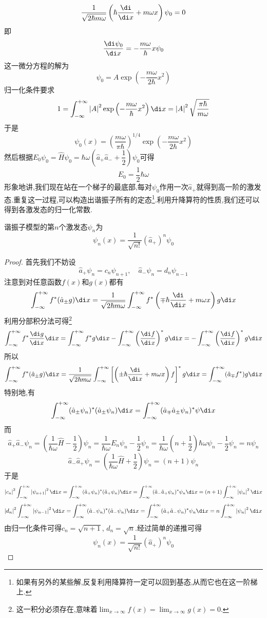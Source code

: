 \documentclass{ctexart}
\begin{document}
\[\dfrac{1}{\sqrt{2\hbar m\omega}}\left(\hbar\dfrac{\di}{\di x}+m\omega x\right)\psi_0=0\]
即
\[\dfrac{\di\psi_0}{\di x}=-\dfrac{m\omega}{\hbar}x\psi_0\]
这一微分方程的解为
\[\psi_0=A\exp\left(-\dfrac{m\omega}{2\hbar}x^2\right)\]
归一化条件要求
\[1=\int_{-\infty}^{+\infty}\left|A\right|^2\exp\left(-\dfrac{m\omega}{\hbar}x^2\right)\di x=\left|A\right|^2\sqrt{\dfrac{\pi\hbar}{m\omega}}\]
于是
\[\psi_0(x)=\left(\dfrac{m\omega}{\pi\hbar}\right)^{1/4}\exp\left(-\dfrac{m\omega}{2\hbar}x^2\right)\]
然后根据$E_0\psi_0=\hat{H}\psi_0=\hbar\omega\left(\hat{a}_+\hat{a}_-+\dfrac12\right)\psi_0$可得
\[E_0=\dfrac12\hbar\omega\]
\indent 形象地讲,我们现在站在一个梯子的最底部,每对$\psi_0$作用一次$\hat{a}_{+}$就得到高一阶的激发态.重复这一过程,可以构造出谐振子所有的定态\footnote{如果有另外的某些解,反复利用降算符一定可以回到基态,从而它也在这一阶梯上.}.利用升降算符的性质,我们还可以得到各激发态的归一化常数.
\begin{theorem}
    谐振子模型的第$n$个激发态$\psi_n$为
    \[\psi_n(x)=\dfrac{1}{\sqrt{n!}}(\hat{a}_+)^n\psi_0\]
\end{theorem}
\begin{proof}
    首先我们不妨设
    \[\hat{a}_+\psi_n=c_n\psi_{n+1},\quad\hat{a}_-\psi_n=d_n\psi_{n-1}\]
    注意到对任意函数$f(x)$和$g(x)$都有
    \[\int_{-\infty}^{+\infty}f^\ast(\hat{a}_{\pm}g)\di x=\dfrac{1}{\sqrt{2\hbar m\omega}}\int_{-\infty}^{+\infty}f^\ast\left(\mp\hbar\dfrac{\di}{\di x}+m\omega x\right)g\di x\]
    利用分部积分法可得\footnote{这一积分必须存在,意味着$\displaystyle\lim_{x\to\infty}f(x)=\lim_{x\to\infty}g(x)=0$.}
    \[\int_{-\infty}^{+\infty}f^\ast\dfrac{\di g}{\di x}\di x=\int_{-\infty}^{+\infty}f^\ast g\di x-\int_{-\infty}^{+\infty}\left(\dfrac{\di f}{\di x}\right)^\ast g\di x=-\int_{-\infty}^{+\infty}\left(\dfrac{\di f}{\di x}\right)^\ast g\di x\]
    所以
    \[\int_{-\infty}^{+\infty}f^\ast(\hat{a}_{\pm}g)\di x=\dfrac{1}{\sqrt{2\hbar m\omega}}\int_{-\infty}^{+\infty}\left[\left(\pm\hbar\dfrac{\di}{\di x}+m\omega x\right)f\right]^\ast g\di x=\int_{-\infty}^{+\infty}(\hat{a}_{\mp}f^\ast)g\di x\]
    特别地,有
    \[\int_{-\infty}^{+\infty}(\hat{a}_{\pm}\psi_n)^\ast(\hat{a}_{\pm}\psi_n)\di x=\int_{-\infty}^{+\infty}(\hat{a}_{\mp}\hat{a}_{\pm}\psi_n)^\ast\psi\di x\]
    而
    \[\hat{a}_{+}\hat{a}_{-}\psi_n=\left(\dfrac{1}{\hbar\omega}\hat{H}-\dfrac12\right)\psi_n=\dfrac{1}{\hbar\omega}E_n\psi_n-\dfrac12\psi_n=\dfrac{1}{\hbar\omega}\left(n+\dfrac12\right)\hbar\omega\psi_n-\dfrac12\psi_n=n\psi_n\]
    \[\hat{a}_{-}\hat{a}_{+}\psi_n=\left(\dfrac{1}{\hbar\omega}\hat{H}+\dfrac12\right)\psi_n=(n+1)\psi_n\]
    于是
    \[\left|c_n\right|^2\int_{-\infty}^{+\infty}\left|\psi_{n+1}\right|^2\di x=\int_{-\infty}^{+\infty}(\hat{a}_{+}\psi_n)^\ast(\hat{a}_{+}\psi_n)\di x=\int_{-\infty}^{+\infty}(\hat{a}_{-}\hat{a}_{+}\psi_n)^\ast\psi_n\di x=(n+1)\int_{-\infty}^{+\infty}\left|\psi_n\right|^2\di x\]
    \[\left|d_n\right|^2\int_{-\infty}^{+\infty}\left|\psi_{n-1}\right|^2\di x=\int_{-\infty}^{+\infty}(\hat{a}_{-}\psi_n)^\ast(\hat{a}_{-}\psi_n)\di x=\int_{-\infty}^{+\infty}(\hat{a}_{+}\hat{a}_{-}\psi_n)^\ast\psi_n\di x=n\int_{-\infty}^{+\infty}\left|\psi_n\right|^2\di x\]
    由归一化条件可得$c_n=\sqrt{n+1}$, $d_n=\sqrt{n}$.经过简单的递推可得
    \[\psi_n(x)=\dfrac{1}{\sqrt{n!}}(\hat{a}_+)^n\psi_0\]
\end{proof}
\end{document}
